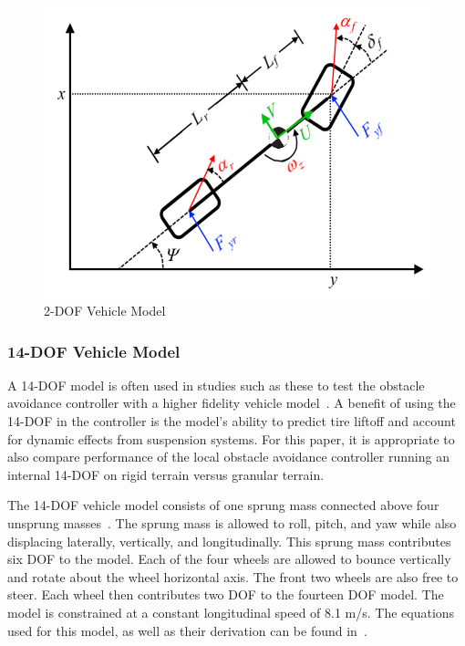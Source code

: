 \documentclass[12pt,twocolumn]{article}
\begin{document}
\begin{figure}
	\centering
	\includegraphics[width=1.0\columnwidth]{Figs/2DOF_haraus.png}
	\caption{\small 2-DOF Vehicle Model}  
	\label{fig:2DOF}
\end{figure}


\subsubsection{14-DOF Vehicle Model}\label{sss:14DOFModel}
A 14-DOF model is often used in studies such as these to test the obstacle avoidance controller with a higher fidelity vehicle model~\cite{ModelFidelity2016, ModelFidelity2013}. A benefit of using the 14-DOF in the controller is the model's ability to predict tire liftoff and account for dynamic effects from suspension systems. For this paper, it is appropriate to also compare performance of the local obstacle avoidance controller running an internal 14-DOF on rigid terrain versus granular terrain.  

The 14-DOF vehicle model consists of one sprung mass connected above four unsprung masses~\cite{RollStudies2007}. The sprung mass is allowed to roll, pitch, and yaw while also displacing laterally, vertically, and longitudinally. This sprung mass contributes six DOF to the model. Each of the four wheels are allowed to bounce vertically and rotate about the wheel horizontal axis. The front two wheels are also free to steer. Each wheel then contributes two DOF to the fourteen DOF model. The model is constrained at a constant longitudinal speed of 8.1 m/s. The equations used for this model, as well as their derivation can be found in~\cite{RollStudies2007}.
\end{document}
